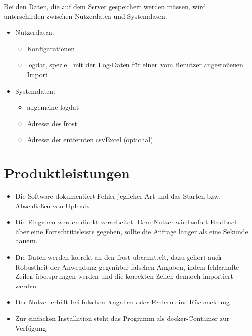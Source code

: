 \documentclass[a4paper, 12 pt]{article}
\begin{document}
	Bei den Daten, die auf dem Server gespeichert werden müssen, wird unterschieden zwischen Nutzerdaten und Systemdaten.
	
\begin{itemize}
	\item Nutzerdaten:
	\begin{itemize}
		\item Konfigurationen
		\item \gls{logdat}, speziell mit den Log-Daten für einen vom Benutzer angestoßenen Import
	\end{itemize}
	\item Systemdaten:
	\begin{itemize}
		\item allgemeine \gls{logdat}
		\item Adresse des \gls{frost}
		\item Adresse der entfernten \gls{csvExcel} (optional) 
	\end{itemize}
\end{itemize}
	
	\section{Produktleistungen}
	\begin{itemize}
		\item Die Software dokumentiert Fehler jeglicher Art und das Starten bzw. Abschließen von Uploads.
		\item Die Eingaben werden direkt verarbeitet. Dem Nutzer wird sofort Feedback über eine Fortschrittsleiste gegeben, sollte die Anfrage länger als eine Sekunde dauern.
		\item Die Daten werden korrekt an den \gls{frost} übermittelt, dazu gehört auch Robustheit der Anwendung gegenüber falschen Angaben, indem fehlerhafte Zeilen übersprungen werden und die korrekten Zeilen dennoch importiert werden.
		\item Der Nutzer erhält bei falschen Angaben oder Fehlern eine Rückmeldung.
		\item Zur einfachen Installation steht das Programm als \gls{docker}-Container zur Verfügung.
	\end{itemize}
	
	
\end{document}
